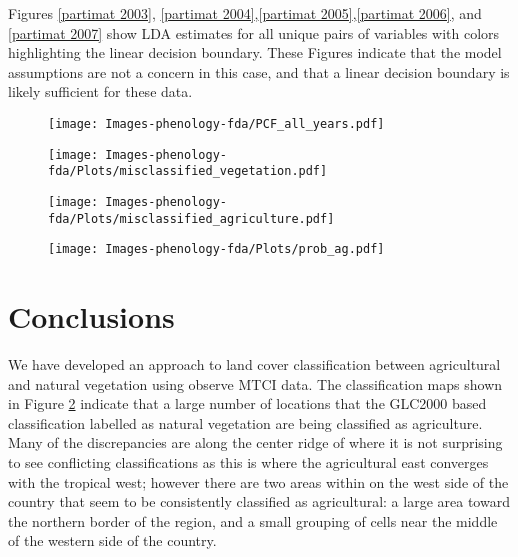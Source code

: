 Figures \ref{partimat 2003}, \ref{partimat 2004},\ref{partimat 2005},\ref{partimat 2006}, and \ref{partimat 2007} show LDA estimates for all unique pairs of variables with colors highlighting the linear decision boundary. These Figures indicate that the model assumptions are not a concern in this case, and that a linear decision boundary is likely sufficient for these data. 

\begin{figure}
	[htbp] \centering 
	\texttt{[image: Images-phenology-fda/PCF\_all\_years.pdf]}  \label{fig:pcf all years} 
\end{figure}

\begin{figure}
	[htbp] \centering 
	\texttt{[image: Images-phenology-fda/Plots/misclassified\_vegetation.pdf]}  
	\label{fig:misclassified vegetation} 
\end{figure}

\begin{figure}
	[htbp] \centering 
	\texttt{[image: Images-phenology-fda/Plots/misclassified\_agriculture.pdf]}  
	\label{fig:misclassified agriculture} 
\end{figure}

\begin{figure}
	[htbp] \centering 
	\texttt{[image: Images-phenology-fda/Plots/prob\_ag.pdf]}  
	\label{fig:probability map} 
\end{figure}


\label{sec:results}


\section{Conclusions} 
We have developed an approach to land cover classification between agricultural and natural vegetation using observe MTCI data. The classification maps shown in Figure \ref{fig:misclassified vegetation} indicate that a large number of locations that the GLC2000 based classification labelled as natural vegetation are being classified as agriculture. Many of the discrepancies are along the center ridge of where it is not surprising to see conflicting classifications as this is where the agricultural east converges with the tropical west; however there are two areas within on the west side of the country that seem to be consistently classified as agricultural: a large area toward the northern border of the region, and a small grouping of cells near the middle of the western side of the country. 

